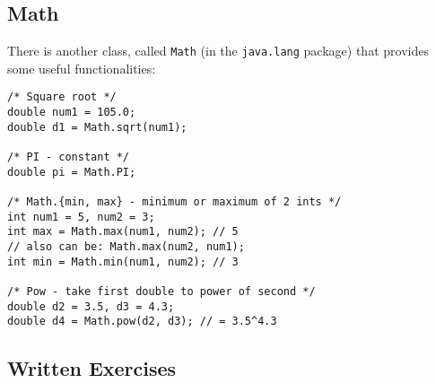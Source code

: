 \subsection{Math}
There is another class, called \verb|Math| (in the \verb|java.lang| package) that provides some useful functionalities:
\begin{lstlisting}
/* Square root */
double num1 = 105.0;
double d1 = Math.sqrt(num1);

/* PI - constant */
double pi = Math.PI; 

/* Math.{min, max} - minimum or maximum of 2 ints */
int num1 = 5, num2 = 3;
int max = Math.max(num1, num2); // 5
// also can be: Math.max(num2, num1);
int min = Math.min(num1, num2); // 3

/* Pow - take first double to power of second */
double d2 = 3.5, d3 = 4.3;
double d4 = Math.pow(d2, d3); // = 3.5^4.3
\end{lstlisting}


\subsection{Written Exercises}

